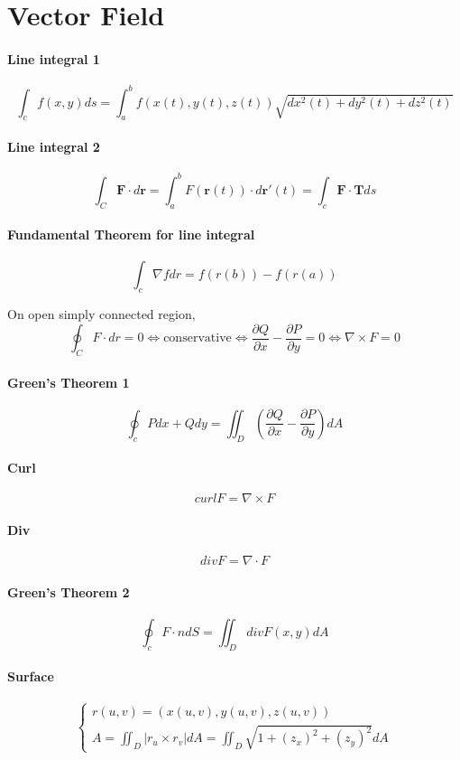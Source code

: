 \documentclass[12pt]{article}
\begin{document}
\section{Vector Field}
\paragraph{Line integral 1}
\[\int_c f(x, y)ds = \int_a^b f(x(t), y(t), z(t))\sqrt{dx^2(t) + dy^2(t) + dz^2(t)}\]

\paragraph{Line integral 2}
\[\int_C \mathbf{F} \cdot d\mathbf{r} = \int_a^b F(\mathbf{r}(t))\cdot d\mathbf{r}'(t) = \int_c \mathbf{F} \cdot \mathbf{T}ds\]

\paragraph{Fundamental Theorem for line integral}
\[\int_c \nabla f dr = f(r(b)) - f(r(a))\]

On open simply connected region,
\[\oint_C F \cdot dr = 0 \Leftrightarrow \mathrm{conservative} \Leftrightarrow \frac{\partial Q}{\partial x} -  \frac{\partial P}{\partial y} = 0 \Leftrightarrow \nabla \times F = 0\]

\paragraph{Green's Theorem 1}
\[\oint_c Pdx + Qdy = \iint_D (\frac{\partial Q}{\partial x} - \frac{\partial P}{\partial y})dA\]

\paragraph{Curl}
\[curl F = \nabla \times F\]

\paragraph{Div}
\[div F = \nabla \cdot F\]

\paragraph{Green's Theorem 2}
\[\oint_c F \cdot n dS = \iint_D div F(x, y)dA\]

\paragraph{Surface}
\[
	\begin{cases}
		r(u, v) = (x(u, v), y(u, v), z(u, v))\\
		A = \iint_D |r_u \times r_v|dA = \iint_D \sqrt{1 + (z_x)^2 + (z_y)^2}dA
	\end{cases}
\]
\end{document}
